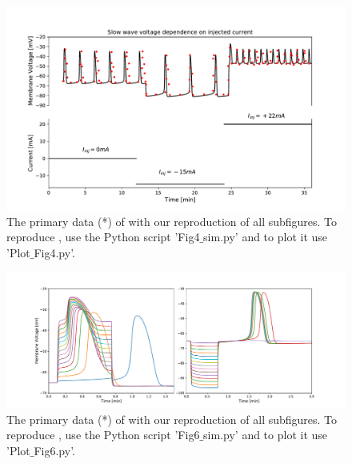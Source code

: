 \documentclass[fleqn,10pt]{physiome}
\begin{document}
\begin{figure}[ht!]%
\includegraphics[width=1.0\linewidth]{Figure_4.pdf}
\caption{The primary data (*) of \cite[Figure 4A]{imtiaz2002theoretical} with our reproduction of all subfigures. To reproduce \cite[Figure 4A]{imtiaz2002theoretical}, use the Python script 'Fig4$\_$sim.py' and to plot it use 'Plot$\_$Fig4.py'.}
\label{fig:fig4}
\end{figure}

\begin{figure}[ht!]%
\includegraphics[width=1.0\linewidth]{Figure_6.pdf}
\caption{The primary data (*) of \cite[Figure 6(A and B)]{imtiaz2002theoretical} with our reproduction of all subfigures. To reproduce \cite[Figure 6(A and B)]{imtiaz2002theoretical}, use the Python script 'Fig6$\_$sim.py' and to plot it use 'Plot$\_$Fig6.py'.}
\label{fig:fig6}
\end{figure}
\end{document}
